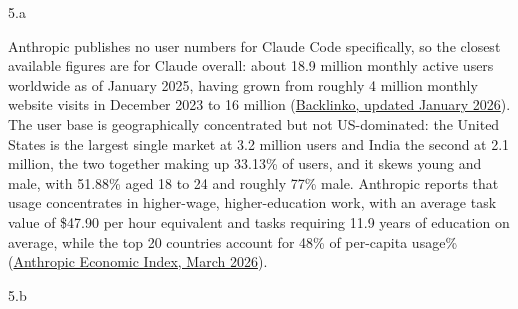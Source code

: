 \LARGE
5.a
\normalsize

\begin{answer}
  Anthropic publishes no user numbers for Claude Code specifically, so the closest available
  figures are for Claude overall: about 18.9 million monthly active users worldwide as of January
  2025, having grown from roughly 4 million monthly website visits in December 2023 to 16 million
  (\href{https://backlinko.com/claude-users}{Backlinko, updated January 2026}). The user base is
  geographically concentrated but not US-dominated: the United States is the largest single market
  at 3.2 million users and India the second at 2.1 million, the two together making up 33.13\% of
  users, and it skews young and male, with 51.88\% aged 18 to 24 and roughly 77\% male. Anthropic reports that usage concentrates in higher-wage, higher-education work, with an average task value of \$47.90 per hour equivalent and tasks requiring 11.9 years of education on
  average, while the top 20 countries account for 48\% of per-capita usage\%
  (\href{https://www.anthropic.com/research/economic-index-march-2026-report}{Anthropic Economic
  Index, March 2026}).
\end{answer}

\LARGE
5.b
\normalsize

